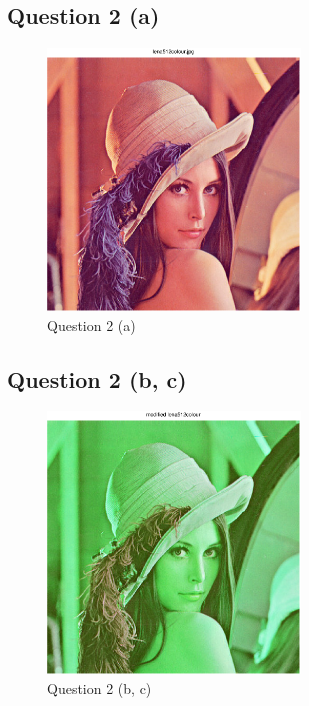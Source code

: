 \documentclass{article}
\begin{document}
\clearpage
\subsection*{Question 2 (a)}

\begin{figure}[!htm]
	\centering
	\includegraphics[width=0.6\textwidth]{assignment_1_04.eps}
	\caption{Question 2 (a)}
\end{figure}

\clearpage
\subsection*{Question 2 (b, c)}

\begin{figure}[!htm]
	\centering
	\includegraphics[width=0.6\textwidth]{assignment_1_05.eps}
	\caption{Question 2 (b, c)}
\end{figure}


\clearpage
\appendix
\end{document}
